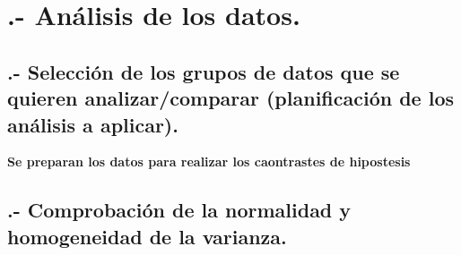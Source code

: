 \documentclass[
]{article}
\newenvironment{Shaded}{\begin{snugshade}}{\end{snugshade}}
\newcommand{\NormalTok}[1]{\textcolor[rgb]{0.80,0.80,0.80}{#1}}
\newcommand{\OperatorTok}[1]{\textcolor[rgb]{0.94,0.94,0.82}{#1}}
\newcommand{\StringTok}[1]{\textcolor[rgb]{0.80,0.58,0.58}{#1}}
\begin{document}
\hypertarget{anuxe1lisis-de-los-datos.}{%
\section{.- Análisis de los datos.}\label{anuxe1lisis-de-los-datos.}}

\hypertarget{selecciuxf3n-de-los-grupos-de-datos-que-se-quieren-analizarcomparar-planificaciuxf3n-de-los-anuxe1lisis-a-aplicar.}{%
\subsection{.- Selección de los grupos de datos que se quieren
analizar/comparar (planificación de los análisis a
aplicar).}\label{selecciuxf3n-de-los-grupos-de-datos-que-se-quieren-analizarcomparar-planificaciuxf3n-de-los-anuxe1lisis-a-aplicar.}}

\textbf{Se preparan los datos para realizar los caontrastes de
hipostesis}

\begin{Shaded}
\end{Shaded}

\hypertarget{comprobaciuxf3n-de-la-normalidad-y-homogeneidad-de-la-varianza.}{%
\subsection{.- Comprobación de la normalidad y homogeneidad de la
varianza.}\label{comprobaciuxf3n-de-la-normalidad-y-homogeneidad-de-la-varianza.}}
\end{document}
